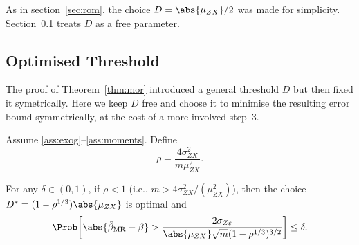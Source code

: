 \begin{remark}
\label{rem:iv_D_choice}
    As in section~\ref{sec:rom}, the choice $D = \abs{\mu_{ZX}}/2$ was made for simplicity. Section~\ref{sec:mor_optimised} treats $D$ as a free parameter.
\end{remark}


\subsection{Optimised Threshold}
\label{sec:mor_optimised}

The proof of Theorem~\ref{thm:mor} introduced a general threshold $D$ but then
fixed it symetrically. Here we keep $D$ free and choose it to minimise the
resulting error bound symmetrically, at the cost of a more involved step~3.

\begin{theorem}
\label{thm:mor_opt}
    Assume \ref{ass:exog}--\ref{ass:moments}. Define
    \[
        \rho = \frac{4\sigma_{ZX}^2}{m\mu_{ZX}^2}.
    \]

    For any $\delta\in(0,1)$, if $\rho < 1$ (i.e., $m > 4\sigma_{ZX}^2/(\mu_{ZX}^2)$),
    then the choice $D^* = (1-\rho^{1/3})\abs{\mu_{ZX}}$ is optimal and
    \begin{equation}
    \label{eq:mor_bound_opt}
        \Prob\!\left[\abs{\hat{\beta}_{\mathrm{MR}} - \beta} > \frac{2\sigma_{Z\varepsilon}}{\abs{\mu_{ZX}}\sqrt{m}(1-\rho^{1/3})^{3/2}} \right] \leq \delta.
    \end{equation}
\end{theorem}

